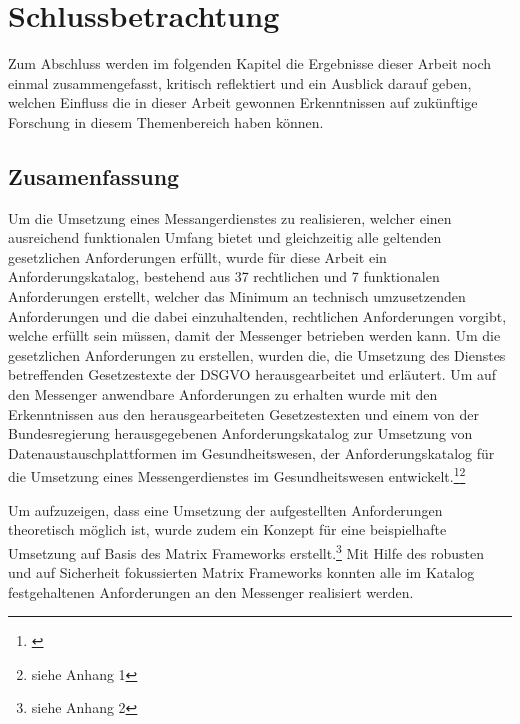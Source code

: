 \chapter{Schlussbetrachtung}\label{chapter:schlussbetrachtung}
Zum Abschluss werden im folgenden Kapitel die Ergebnisse dieser Arbeit noch einmal zusammengefasst, kritisch reflektiert und ein Ausblick darauf geben, welchen Einfluss die in dieser Arbeit gewonnen Erkenntnissen auf zukünftige Forschung in diesem Themenbereich haben können.

\section{Zusamenfassung}\label{chapter:kr}

Um die Umsetzung eines Messangerdienstes zu realisieren, welcher einen ausreichend funktionalen Umfang bietet und gleichzeitig alle geltenden gesetzlichen Anforderungen erfüllt, wurde für diese Arbeit ein Anforderungskatalog, bestehend aus 37 rechtlichen und 7 funktionalen Anforderungen erstellt, welcher das Minimum an technisch umzusetzenden Anforderungen und die dabei einzuhaltenden, rechtlichen Anforderungen vorgibt, welche erfüllt sein müssen, damit der Messenger betrieben werden kann. Um die gesetzlichen Anforderungen zu erstellen, wurden die, die Umsetzung des Dienstes betreffenden Gesetzestexte der DSGVO herausgearbeitet und erläutert. Um auf den Messenger anwendbare Anforderungen zu erhalten wurde mit den Erkenntnissen aus den herausgearbeiteten Gesetzestexten und einem von der Bundesregierung herausgegebenen Anforderungskatalog zur Umsetzung von Datenaustauschplattformen im Gesundheitswesen, der Anforderungskatalog für die Umsetzung eines Messengerdienstes im Gesundheitswesen entwickelt.\footnote{\cite[S. 41]{Bundesverband-Gesundheits-IT-e.V.2016}}\footnote{siehe Anhang 1}

Um aufzuzeigen, dass eine Umsetzung der aufgestellten Anforderungen theoretisch möglich ist, wurde zudem ein Konzept für eine beispielhafte Umsetzung auf Basis des Matrix Frameworks erstellt.\footnote{siehe Anhang 2} Mit Hilfe des robusten und auf Sicherheit fokussierten Matrix Frameworks konnten alle im Katalog festgehaltenen Anforderungen an den Messenger realisiert werden. 

